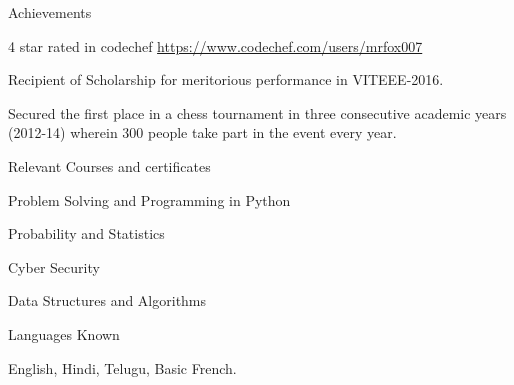 \documentclass{resume} %
\begin{document}

\begin{rSection}{Achievements} \itemsep -4pt
    \item 4 star rated in codechef \url{https://www.codechef.com/users/mrfox007}
    \item Recipient of Scholarship for meritorious performance in VITEEE-2016.
    \item Secured the first place in a chess tournament in three consecutive academic years (2012-14) wherein \phantom{x} 300 people take part in the event every year.
\end{rSection}

\begin{rSection}{Relevant Courses and certificates} \itemsep -4pt \topmargin -50pt
    \item Problem Solving and Programming in Python 
    \item Probability and Statistics
    \item Cyber Security
    \item Data Structures and Algorithms
\end{rSection}

\begin{rSection}{Languages Known} \itemsep -4pt
    \item English, Hindi, Telugu, Basic French.
\end{rSection}
\end{document}
